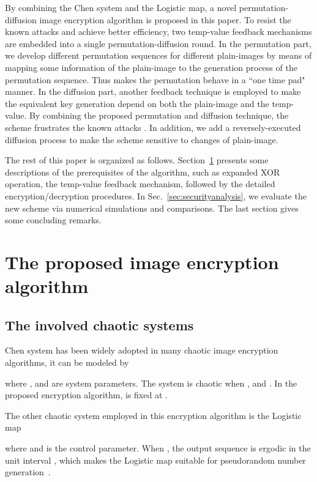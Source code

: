 \documentclass[3p,preprint,11pt]{elsarticle}
\begin{document}
By combining the Chen system and the Logistic map, a novel permutation-diffusion image encryption algorithm
is proposed in this paper.
To resist the known attacks and achieve better efficiency, two temp-value feedback mechanisms are embedded into
a single permutation-diffusion round.
In the permutation part, we develop different permutation sequences for different plain-images
by means of mapping some information of the plain-image to the generation process of the permutation sequence.
Thus makes the permutation behave in a ``one time pad" manner.
In the diffusion part, another feedback technique is employed to make the
equivalent key generation depend on both the plain-image and the temp-value. By combining the proposed
permutation and diffusion technique, the scheme frustrates the known attacks \cite{Solak:AnalyFridrich:IJBC10,
Chengqing:AnalysisFridrichstructure:IEEECirSys08}.
In addition, we add a reversely-executed diffusion process to make the scheme sensitive to changes of plain-image.




The rest of this paper is organized as follows. Section~\ref{sec:scheme} presents some descriptions
of the prerequisites of the algorithm, such as expanded XOR operation, the temp-value feedback mechanism,
followed by the detailed encryption/decryption procedures.
In Sec.~\ref{sec:securityanalysis}, we evaluate the new scheme via
numerical simulations and comparisons. The last section gives some concluding remarks.



\section{The proposed image encryption algorithm}
\label{sec:scheme}
\subsection{The involved chaotic systems}
Chen system has been widely adopted in many chaotic image encryption algorithms, it can be modeled
by \cite{Chen:3DChaoticCipher:CSF04}

where ,  and  are system parameters. The system is chaotic when ,  and .
In the proposed encryption algorithm,  is fixed at .

The other chaotic system employed in this encryption algorithm is the Logistic map

where  and  is the control parameter. When , the output sequence
is ergodic in the unit interval , which makes the Logistic map suitable for pseudorandom
 number generation~\cite{Andrecut:LogisticasRan:IJMPB98}.
\end{document}
